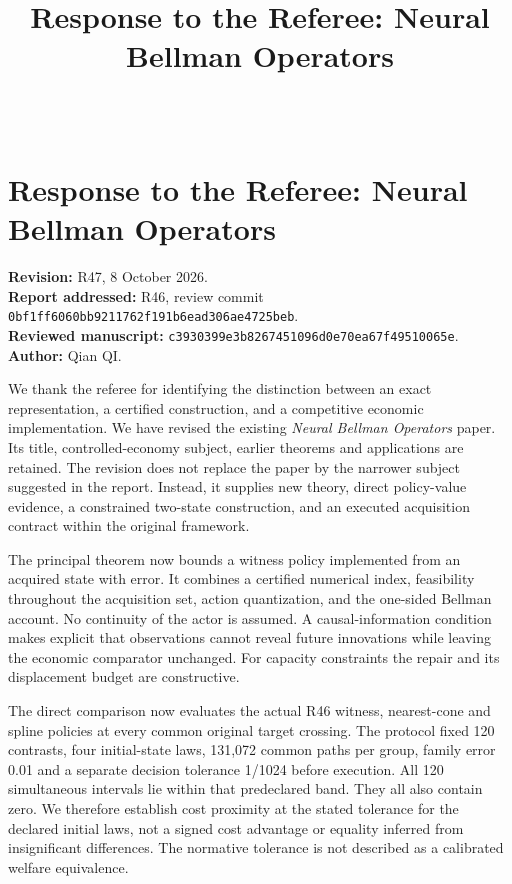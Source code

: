\documentclass[ecta,nameyear,draft]{econsocart}
\begin{document}
\begin{frontmatter}
\title{Response to the Referee: Neural Bellman Operators}
\begin{aug}\author[id=au1,addressref={add1}]{~}\address[id=add1]{Peking University}\end{aug}
\end{frontmatter}
\hypertarget{response-to-the-referee-neural-bellman-operators}{%
\section{Response to the Referee: Neural Bellman
Operators}\label{response-to-the-referee-neural-bellman-operators}}

\textbf{Revision:} R47, 8 October 2026.\\
\textbf{Report addressed:} R46, review commit
\nolinkurl{0bf1ff6060bb9211762f191b6ead306ae4725beb}.\\
\textbf{Reviewed manuscript:}
\nolinkurl{c3930399e3b8267451096d0e70ea67f49510065e}.\\
\textbf{Author:} Qian QI.

We thank the referee for identifying the distinction between an exact
representation, a certified construction, and a competitive economic
implementation. We have revised the existing \emph{Neural Bellman
Operators} paper. Its title, controlled-economy subject, earlier
theorems and applications are retained. The revision does not replace
the paper by the narrower subject suggested in the report. Instead, it
supplies new theory, direct policy-value evidence, a constrained
two-state construction, and an executed acquisition contract within the
original framework.

The principal theorem now bounds a witness policy implemented from an
acquired state with error. It combines a certified numerical index,
feasibility throughout the acquisition set, action quantization, and the
one-sided Bellman account. No continuity of the actor is assumed. A
causal-information condition makes explicit that observations cannot
reveal future innovations while leaving the economic comparator
unchanged. For capacity constraints the repair and its displacement
budget are constructive.

The direct comparison now evaluates the actual R46 witness, nearest-cone
and spline policies at every common original target crossing. The
protocol fixed 120 contrasts, four initial-state laws, 131,072 common
paths per group, family error 0.01 and a separate decision tolerance
1/1024 before execution. All 120 simultaneous intervals lie within that
predeclared band. They all also contain zero. We therefore establish
cost proximity at the stated tolerance for the declared initial laws,
not a signed cost advantage or equality inferred from insignificant
differences. The normative tolerance is not described as a calibrated
welfare equivalence.
\end{document}
